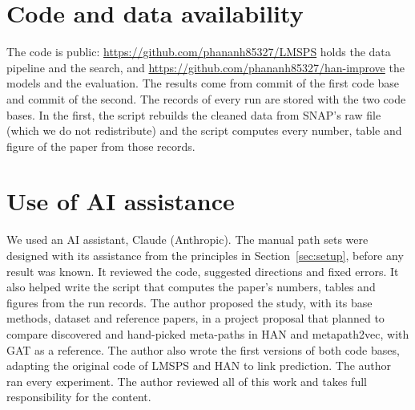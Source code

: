 \section*{Code and data availability}
The code is public: \url{https://github.com/phananh85327/LMSPS} holds the data pipeline and the
search, and \url{https://github.com/phananh85327/han-improve} the models and the evaluation. The
results come from commit \texttt{} of the first code base and commit
\texttt{} of the second. The records of every run are stored with the two code
bases. In the first, the script  rebuilds the cleaned data from SNAP's
raw file (which we do not redistribute) and the script  computes every
number, table and figure of the paper from those records.

\section*{Use of AI assistance}
We used an AI assistant, Claude (Anthropic). The manual path sets were designed with its assistance
from the principles in Section~\ref{sec:setup}, before any result was known. It reviewed the code,
suggested directions and fixed errors. It also helped write the script that computes the paper's
numbers, tables and figures from the run records. The author proposed the study, with its base
methods, dataset and reference papers, in a project proposal that planned to compare discovered and
hand-picked meta-paths in HAN and metapath2vec, with GAT as a reference. The author also wrote the
first versions of both code bases, adapting the original code of LMSPS and HAN to link prediction.
The author ran every experiment. The author reviewed all of this work and takes full responsibility
for the content.
